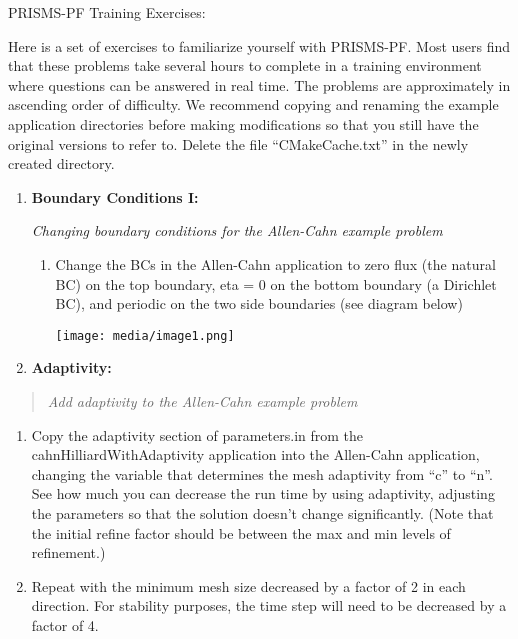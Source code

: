 \documentclass[]{article}
\date{}
\begin{document}
PRISMS-PF Training Exercises:

Here is a set of exercises to familiarize yourself with PRISMS-PF. Most
users find that these problems take several hours to complete in a
training environment where questions can be answered in real time. The
problems are approximately in ascending order of difficulty. We
recommend copying and renaming the example application directories
before making modifications so that you still have the original versions
to refer to. Delete the file ``CMakeCache.txt'' in the newly created
directory.

\begin{enumerate}
\def\labelenumi{\arabic{enumi}.}
\item
  \textbf{Boundary Conditions I: }

  \emph{Changing boundary conditions for the Allen-Cahn example problem}

  \begin{enumerate}
  \def\labelenumii{\alph{enumii}.}
  \item
    Change the BCs in the Allen-Cahn application to zero flux (the
    natural BC) on the top boundary, eta = 0 on the bottom boundary (a
    Dirichlet BC), and periodic on the two side boundaries (see diagram
    below)

    \texttt{[image: media/image1.png]}
  \end{enumerate}
\item
  \textbf{Adaptivity: }
\end{enumerate}

\begin{quote}
\emph{Add adaptivity to the Allen-Cahn example problem}
\end{quote}

\begin{enumerate}
\def\labelenumi{\alph{enumi}.}
\item
  Copy the adaptivity section of parameters.in from the
  cahnHilliardWithAdaptivity application into the Allen-Cahn
  application, changing the variable that determines the mesh adaptivity
  from ``c'' to ``n''. See how much you can decrease the run time by
  using adaptivity, adjusting the parameters so that the solution
  doesn't change significantly. (Note that the initial refine factor
  should be between the max and min levels of refinement.)
\item
  Repeat with the minimum mesh size decreased by a factor of 2 in each
  direction. For stability purposes, the time step will need to be
  decreased by a factor of 4.
\end{enumerate}
\end{document}
